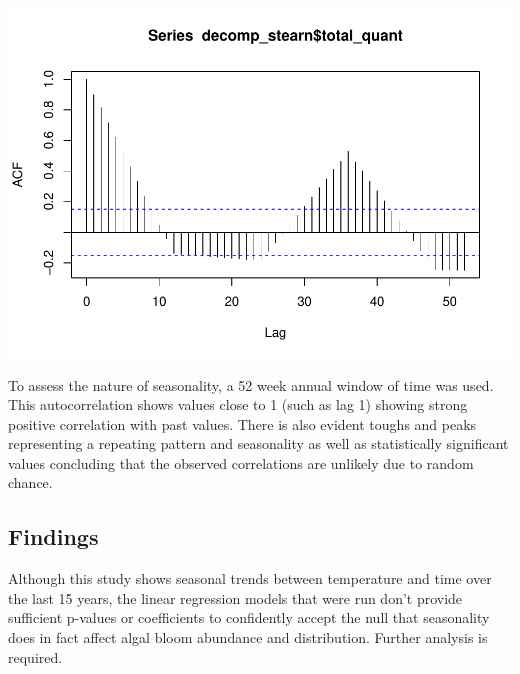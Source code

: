 \documentclass[
]{article}
\newenvironment{Shaded}{\begin{snugshade}}{\end{snugshade}}
\newcommand{\AttributeTok}[1]{\textcolor[rgb]{0.13,0.29,0.53}{#1}}
\newcommand{\DecValTok}[1]{\textcolor[rgb]{0.00,0.00,0.81}{#1}}
\newcommand{\FunctionTok}[1]{\textcolor[rgb]{0.13,0.29,0.53}{\textbf{#1}}}
\newcommand{\NormalTok}[1]{#1}
\newcommand{\SpecialCharTok}[1]{\textcolor[rgb]{0.81,0.36,0.00}{\textbf{#1}}}
\begin{document}
\begin{Shaded}
\end{Shaded}

\includegraphics{algae_temp_analysis_files/figure-latex/unnamed-chunk-13-1.pdf}

To assess the nature of seasonality, a 52 week annual window of time was
used. This autocorrelation shows values close to 1 (such as lag 1)
showing strong positive correlation with past values. There is also
evident toughs and peaks representing a repeating pattern and
seasonality as well as statistically significant values concluding that
the observed correlations are unlikely due to random chance.

\hypertarget{findings}{%
\subsection{Findings}\label{findings}}

Although this study shows seasonal trends between temperature and time
over the last 15 years, the linear regression models that were run don't
provide sufficient p-values or coefficients to confidently accept the
null that seasonality does in fact affect algal bloom abundance and
distribution. Further analysis is required.
\end{document}
